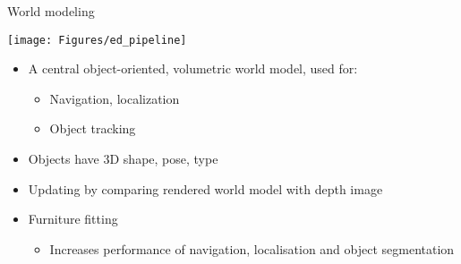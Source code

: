 \documentclass[12pt,a4paper]{article}
\newcommand{\emptylogo}{\texttt{[image: Figures/Empty]}}
\begin{document}
\begin{slidetop}
\begin{multicols}{2}
\begin{bclogo}[couleur = white, arrondi = 0.25, couleurBord = tuedarkblue , barre = none, logo=\emptylogo]{\textcolor{tuedarkblue}{World modeling}}
\medskip %
\begin{minipage}[T]{\textwidth}
    \begin{center}
        \texttt{[image: Figures/ed\_pipeline]}
    \end{center}
\end{minipage}
\begin{itemize}[itemsep = 0pt, parsep = 0pt, leftmargin=15pt]
	\item A central object-oriented, volumetric world model, used for:	
	\begin{itemize}[itemsep = 0pt, parsep = 0pt, leftmargin=15pt]
		\item Navigation, localization
		\item Object tracking
	\end{itemize}
	\item Objects have 3D shape, pose, type
	\item Updating by comparing rendered world model with depth image
    \item Furniture fitting
    \begin{itemize}[itemsep = 0pt, parsep = 0pt, leftmargin=15pt]
		\item Increases performance of navigation, localisation and object segmentation
	\end{itemize}


\end{itemize}
\end{bclogo}

\vspace{-0.83cm} %


\end{multicols}
\end{slidetop}
\end{document}
